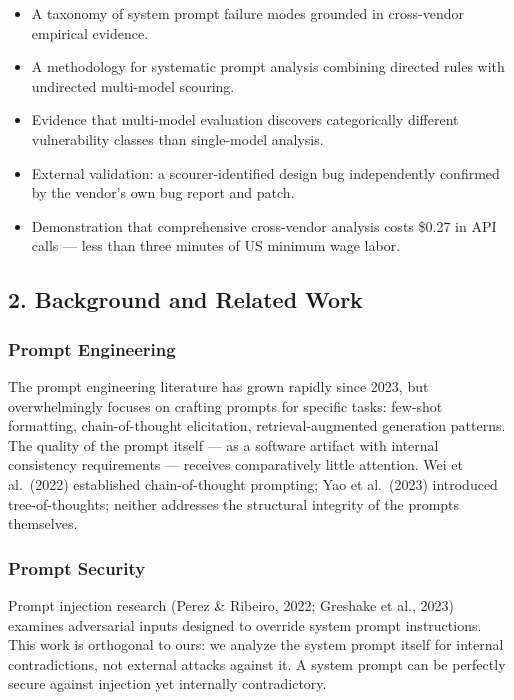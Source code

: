 \documentclass[
]{article}
\providecommand{\tightlist}{%
  \setlength{\itemsep}{0pt}\setlength{\parskip}{0pt}}
\begin{document}
\begin{itemize}
\tightlist
\item
  A taxonomy of system prompt failure modes grounded in cross-vendor
  empirical evidence.
\item
  A methodology for systematic prompt analysis combining directed rules
  with undirected multi-model scouring.
\item
  Evidence that multi-model evaluation discovers categorically different
  vulnerability classes than single-model analysis.
\item
  External validation: a scourer-identified design bug independently
  confirmed by the vendor's own bug report and patch.
\item
  Demonstration that comprehensive cross-vendor analysis costs \$0.27 in
  API calls --- less than three minutes of US minimum wage labor.
\end{itemize}

\hypertarget{background-and-related-work}{%
\subsection{2. Background and Related
Work}\label{background-and-related-work}}

\hypertarget{prompt-engineering}{%
\subsubsection{Prompt Engineering}\label{prompt-engineering}}

The prompt engineering literature has grown rapidly since 2023, but
overwhelmingly focuses on crafting prompts for specific tasks: few-shot
formatting, chain-of-thought elicitation, retrieval-augmented generation
patterns. The quality of the prompt itself --- as a software artifact
with internal consistency requirements --- receives comparatively little
attention. Wei et al.~(2022) established chain-of-thought prompting; Yao
et al.~(2023) introduced tree-of-thoughts; neither addresses the
structural integrity of the prompts themselves.

\hypertarget{prompt-security}{%
\subsubsection{Prompt Security}\label{prompt-security}}

Prompt injection research (Perez \& Ribeiro, 2022; Greshake et al.,
2023) examines adversarial inputs designed to override system prompt
instructions. This work is orthogonal to ours: we analyze the system
prompt itself for internal contradictions, not external attacks against
it. A system prompt can be perfectly secure against injection yet
internally contradictory.
\end{document}
